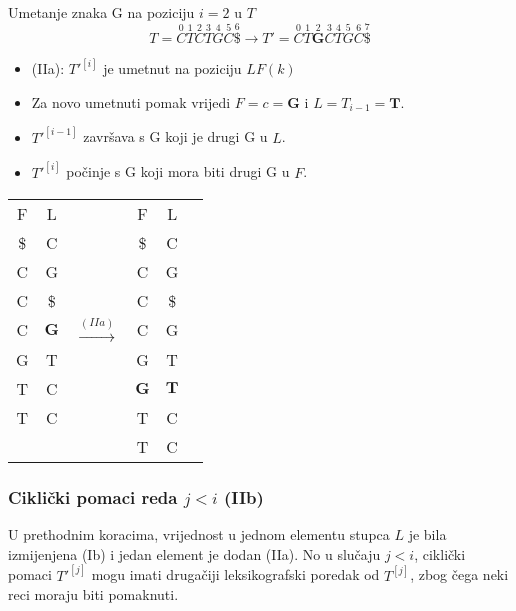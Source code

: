 \documentclass{ferseminar}
\begin{document}
\begin{minipage}{0.5\textwidth}
\footnotesize
Umetanje znaka G na poziciju $i=2$ u $T$
$$
	T=\overset{0}{C}	\overset{1}{T} \overset{2}{C} \overset{3}{T}	\overset{4}{G}
	\overset{5}{C}	\overset{6}{\$} \rightarrow		
	T'=\overset{0}{C}	\overset{1}{T}	\overset{2}{\boldsymbol{G}}  \overset{3}{C} \overset{4}{T}	\overset{5}{G}
	\overset{6}{C}	\overset{7}{\$} 	
$$
\begin{itemize}
  \item[] (IIa): $T'^{[i]}$ je umetnut na poziciju $LF(k)$
  \item[] Za novo umetnuti pomak vrijedi $F=c=\boldsymbol{G}$ i $L=T_{i-1}=\boldsymbol{T}$.
  \item[] $T'^{[i-1]}$ završava s G koji je drugi G u $L$.
  \item[] $T'^{[i]}$ počinje s G koji mora biti drugi G u $F$.
\end{itemize}

\end{minipage} \hfill
\begin{minipage}{0.45\textwidth}
\hspace{.2\textwidth}
\begin{tabular}{cccc|cc}
	\multicolumn{1}{c|}{F} & L & & F & L \\
	\cline{1-2}	\cline{4-5}
	\multicolumn{1}{c|}{\$} & C & & \$ & C \\
	\multicolumn{1}{c|}{C} & G & & C & G \\
	\multicolumn{1}{c|}{C} & \$ & & C & \$ \\
	
	\multicolumn{1}{c|}{C} & $\boldsymbol{G}$ & $\stackrel{(IIa)}{\longrightarrow}$ & C & G \\
	
	\multicolumn{1}{c|}{G} & T & & G & T \\
	\cline{4-5}
	\multicolumn{1}{c|}{T} & C & & \multicolumn{1}{|c|}{$\boldsymbol{G}$} & \multicolumn{1}{c|}{$\boldsymbol{T}$} \\
	\cline{4-5}
	\multicolumn{1}{c|}{T} & C & & T & C \\
	  &   & & T & C
\end{tabular}

\end{minipage}

\subsubsection{Ciklički pomaci reda $j<i$ (IIb)}
U prethodnim koracima, vrijednost u jednom elementu stupca $L$ je bila izmijenjena (Ib) i jedan element je dodan (IIa). No u slučaju $j<i$, ciklički pomaci $T'^[j]$ mogu imati drugačiji leksikografski poredak od $T^{[j]}$, zbog čega neki reci moraju biti pomaknuti.
\end{document}
